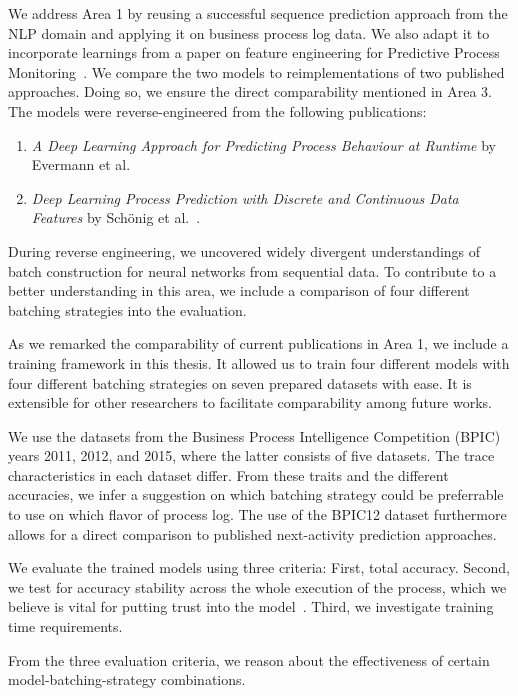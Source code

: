 We address Area 1 by reusing a successful sequence prediction approach from the NLP domain and applying it on business process log data. We also adapt it to incorporate learnings from a paper on feature engineering for Predictive Process Monitoring~\cite{klinkmuller2018reliablemonitoring}. We compare the two models to reimplementations of two published approaches. Doing so, we ensure the direct comparability mentioned in Area 3. The models were reverse-engineered from the following publications:

\begin{enumerate}
    \item\textit{A Deep Learning Approach for Predicting Process Behaviour at Runtime} by Evermann et al.~\cite{evermann2016}
    \item\textit{Deep Learning Process Prediction with Discrete and Continuous Data Features} by Schönig et al.~\cite{schoenig2018}.
\end{enumerate}

During reverse engineering, we uncovered widely divergent understandings of batch construction for neural networks from sequential data. To contribute to a better understanding in this area, we include a comparison of four different batching strategies into the evaluation.

As we remarked the comparability of current publications in Area 1, we include a training framework in this thesis. It allowed us to train four different models with four different batching strategies on seven prepared datasets with ease. It is extensible for other researchers to facilitate comparability among future works.

We use the datasets from the Business Process Intelligence Competition (BPIC) years 2011, 2012, and 2015, where the latter consists of five datasets. The trace characteristics in each dataset differ. From these traits and the different accuracies, we infer a suggestion on which batching strategy could be preferrable to use on which flavor of process log. The use of the BPIC12 dataset furthermore allows for a direct comparison to published next-activity prediction approaches.

We evaluate the trained models using three criteria: First, total accuracy. Second, we test for accuracy stability across the whole execution of the process, which we believe is vital for putting trust into the model~\cite{francescomarino2015, boehmer2018probability}. Third, we investigate training time requirements.

From the three evaluation criteria, we reason about the effectiveness of certain model-batching-strategy combinations.

